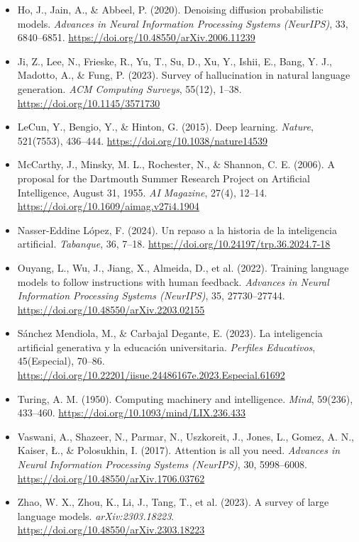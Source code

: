 \begin{itemize}[leftmargin=1.5em, label={}, itemsep=0.45ex, parsep=0pt]
    \item Ho, J., Jain, A., \& Abbeel, P. (2020). Denoising diffusion probabilistic models. \textit{Advances in Neural Information Processing Systems (NeurIPS)}, 33, 6840--6851. \url{https://doi.org/10.48550/arXiv.2006.11239}
    \item Ji, Z., Lee, N., Frieske, R., Yu, T., Su, D., Xu, Y., Ishii, E., Bang, Y. J., Madotto, A., \& Fung, P. (2023). Survey of hallucination in natural language generation. \textit{ACM Computing Surveys}, 55(12), 1--38. \url{https://doi.org/10.1145/3571730}
    \item LeCun, Y., Bengio, Y., \& Hinton, G. (2015). Deep learning. \textit{Nature}, 521(7553), 436--444. \url{https://doi.org/10.1038/nature14539}
    \item McCarthy, J., Minsky, M. L., Rochester, N., \& Shannon, C. E. (2006). A proposal for the Dartmouth Summer Research Project on Artificial Intelligence, August 31, 1955. \textit{AI Magazine}, 27(4), 12--14. \url{https://doi.org/10.1609/aimag.v27i4.1904}
    \item Nasser-Eddine López, F. (2024). Un repaso a la historia de la inteligencia artificial. \textit{Tabanque}, 36, 7--18. \url{https://doi.org/10.24197/trp.36.2024.7-18}
    \item Ouyang, L., Wu, J., Jiang, X., Almeida, D., et al. (2022). Training language models to follow instructions with human feedback. \textit{Advances in Neural Information Processing Systems (NeurIPS)}, 35, 27730--27744. \url{https://doi.org/10.48550/arXiv.2203.02155}
    \item Sánchez Mendiola, M., \& Carbajal Degante, E. (2023). La inteligencia artificial generativa y la educación universitaria. \textit{Perfiles Educativos}, 45(Especial), 70--86. \url{https://doi.org/10.22201/iisue.24486167e.2023.Especial.61692}
    \item Turing, A. M. (1950). Computing machinery and intelligence. \textit{Mind}, 59(236), 433--460. \url{https://doi.org/10.1093/mind/LIX.236.433}
    \item Vaswani, A., Shazeer, N., Parmar, N., Uszkoreit, J., Jones, L., Gomez, A. N., Kaiser, \L., \& Polosukhin, I. (2017). Attention is all you need. \textit{Advances in Neural Information Processing Systems (NeurIPS)}, 30, 5998--6008. \url{https://doi.org/10.48550/arXiv.1706.03762}
    \item Zhao, W. X., Zhou, K., Li, J., Tang, T., et al. (2023). A survey of large language models. \textit{arXiv:2303.18223}. \url{https://doi.org/10.48550/arXiv.2303.18223}
\end{itemize}
